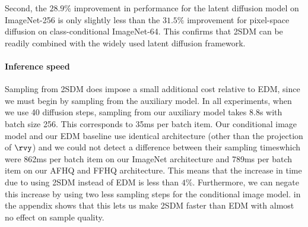 Second, the $28.9\%$ improvement in performance for the latent diffusion model on ImageNet-256 is only slightly less than the $31.5\%$ improvement for pixel-space diffusion on class-conditional ImageNet-64. This confirms that 2SDM can be readily combined with the widely used latent diffusion framework.


\paragraph{Inference speed}
Sampling from 2SDM does impose a small additional cost relative to EDM, since we must begin by sampling from the auxiliary model. In all experiments, when we use 40 diffusion steps, sampling from our auxiliary model takes 8.8s with batch size 256. This corresponds to 35ms per batch item. Our conditional image model and our EDM baseline use identical architecture (other than the projection of $\rvy$) and we could not detect a difference between their sampling timeswhich were 862ms per batch item on our ImageNet architecture and 789ms per batch item on our AFHQ and FFHQ architecture. This means that the increase in time due to using 2SDM instead of EDM is less than $4\%$. Furthermore, we can negate this increase by using two less sampling steps for the conditional image model.  in the appendix shows that this lets us make 2SDM faster than EDM with almost no effect on sample quality.

